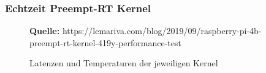 \documentclass[12pt,a4paper,bibliography=totoc,listof=totoc]{scrartcl}
\newcommand{\source}[1]{\caption*{\textbf{Quelle:} {#1}} }
\begin{document}
\subsubsection{Echtzeit Preempt-RT Kernel} \label{subsec:Kernel}
\begin{figure}[htbp]
    \centering
    \qquad
    \caption{Latenzen und Temperaturen der jeweiligen Kernel}%
    \source{https://lemariva.com/blog/2019/09/raspberry-pi-4b-preempt-rt-kernel-419y-performance-test}
    \label{fig:Kernel}%
\end{figure}
\end{document}
